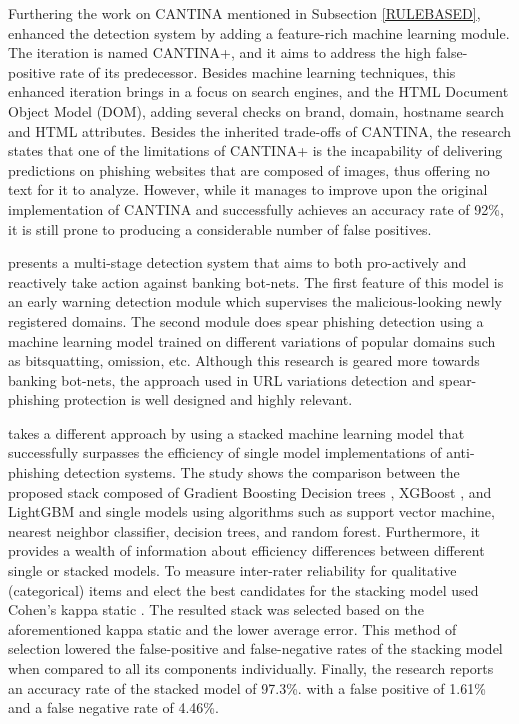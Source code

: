 Furthering the work on CANTINA mentioned in Subsection \ref{RULEBASED},
\cite{CANTINA+} enhanced the detection system by adding a feature-rich machine
learning module. The iteration is named CANTINA+, and it aims to address the
high false-positive rate of its predecessor. Besides machine learning
techniques, this enhanced iteration brings in a focus on search engines, and the
HTML Document Object Model (DOM), adding several checks on brand, domain,
hostname search and HTML attributes. Besides the inherited trade-offs of
CANTINA, the research states that one of the limitations of CANTINA+ is the
incapability of delivering predictions on phishing websites that are composed of
images, thus offering no text for it to analyze. However, while it manages to
improve upon the original implementation of CANTINA and successfully achieves an
accuracy rate of 92\%, it is still prone to producing a considerable number of
false positives.

\cite{MULTISTAGED_DETECTION_BOTNETS} presents a multi-stage detection system
that aims to both pro-actively and reactively take action against banking
bot-nets. The first feature of this model is an early warning detection module
which supervises the malicious-looking newly registered domains. The second
module does spear phishing detection using a machine learning model trained on
different variations of popular domains such as bitsquatting, omission, etc.
Although this research is geared more towards banking bot-nets, the approach
used in URL variations detection and spear-phishing protection is well designed
and highly relevant.

\cite{STACKED_ML_URL_HTML} takes a different approach by using a stacked machine
learning model that successfully surpasses the efficiency of single model
implementations of anti-phishing detection systems. The study shows the
comparison between the proposed stack composed of Gradient Boosting Decision
trees \citep{GBDT}, XGBoost \citep{XGBOOST}, and LightGBM \citep{LIGHTGBM} and
single models using algorithms such as support vector machine, nearest neighbor
classifier, decision trees, and random forest. Furthermore, it provides a wealth
of information about efficiency differences between different single or stacked
models. To measure inter-rater reliability for qualitative (categorical) items
and elect the best candidates for the stacking model \cite{STACKED_ML_URL_HTML}
used Cohen's kappa static \citep{DATA_MINING_T&T}. The resulted stack was
selected based on the aforementioned kappa static and the lower average error.
This method of selection lowered the false-positive and false-negative rates of the stacking model when compared to all its components
individually. Finally, the research reports an accuracy rate of the stacked
model of 97.3\%. with a false positive of 1.61\% and a false negative rate of
4.46\%.

